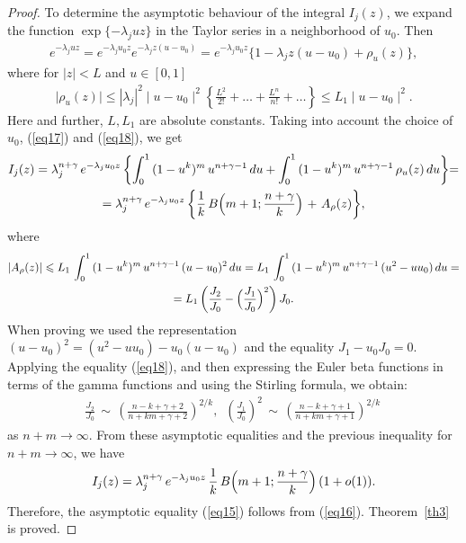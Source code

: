 \documentclass[
11pt,%
tightenlines,%
twoside,%
onecolumn,%
nofloats,%
nobibnotes,%
nofootinbib,%
superscriptaddress,%
noshowpacs,%
centertags]%
{revtex4}
\begin{document}
\begin{proof}
To determine the asymptotic behaviour of the integral $I_j(z)$,
we expand the function $\exp\{-\lambda_juz\}$
in the Taylor series in a neighborhood of $u_0$. Then
\begin{eqnarray*}
e^{-\lambda_juz}=e^{-\lambda_ju_0z}e^{-\lambda_jz(u-u_0)}
=e^{-\lambda_ju_0z}\{1-\lambda_jz(u-u_0)+\rho_u(z)\},
\end{eqnarray*}
where for $|z|<L$ and $u\in[0,1]$
\begin{eqnarray*}
\mid\rho_u(z)\mid\leqslant|\lambda_j|^2\mid u-u_0\mid
^2\left\{\frac{L^2}{2!}+\ldots+\frac{L^n}{n!}+\ldots\right\}\leqslant
L_1\mid u-u_0\mid ^2.
\end{eqnarray*}
Here and further, $L, L_1$ are absolute constants.
Taking into account the choice of $u_0$, (\ref{eq17}) and (\ref{eq18}), we get
\begin{gather*}
I_j(z)=\lambda_j^{n+\gamma}\,e^{-\lambda_ju_0z}\,\biggl\{\int_0^{1}\,
(1-u^k)^m\,u^{n+\gamma-1}\,du+\int_0^{1}\,
(1-u^k)^m\,u^{n+\gamma-1}\,\rho_u(z)\,du\biggl\}=\\
=\lambda_j^{n+\gamma}\,e^{-\lambda_ju_0z}\,\biggl\{\frac{1}{k}\,
B\Bigl(m+1;\frac{n+\gamma}{k}\Bigl)
\,\,+\,\,A_{\rho}(z)\biggl\},
\end{gather*}
where
\begin{gather*}
|A_{\rho}(z)|\leqslant L_1\,\int_0^{1}\,
(1-u^k)^m\,u^{n+\gamma-1}\,(u-u_0)^2\,du=L_1\,\int_0^{1}\,
(1-u^k)^m\,u^{n+\gamma-1}\,(u^2-uu_0)\,du=\\
=L_1\,\biggl(\frac{J_2}{J_0}-
\Bigl(\frac{J_1}{J_0}\Bigl)^2\biggl)\,J_0.
\end{gather*}
When proving we used the representation $(u-u_0)^2=(u^2-uu_0)-u_0(u-u_0)$ and the equality $J_1-u_0J_0=0$.
Applying the equality (\ref{eq18}), and then expressing
the Euler beta functions in terms of the gamma functions
and using the Stirling formula, we obtain:
\begin{eqnarray*}
\frac{J_2}{J_0}\,\sim\,
\left(\frac{n-k+\gamma+2}{n+km+\gamma+2}\right)^{2/k},\,\,\,
\left(\frac{J_1}{J_0}\right)^2\,\sim\,
\left(\frac{n-k+\gamma+1}{n+km+\gamma+1}\right)^{2/k}\,
\end{eqnarray*}
as $n+m\rightarrow\infty$.
From these asymptotic equalities and the previous inequality for $n+m\rightarrow\infty$, we have
\begin{eqnarray*}
I_j(z)=\lambda_j^{n+\gamma}\,e^{-\lambda_ju_0z}\,
\frac{1}{k}\,B\Bigl(m+1;\frac{n+\gamma}{k}\Bigl) \,(1+o(1)).
\end{eqnarray*}
Therefore, the asymptotic equality (\ref{eq15}) follows from (\ref{eq16}).
Theorem~\ref{th3} is proved.
\end{proof}
\end{document}
